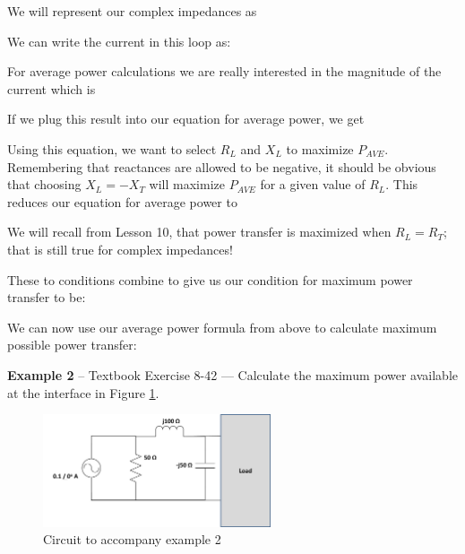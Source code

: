 \documentclass{handout}
\begin{document}
We will represent our complex impedances as
\soln{1in}{
\[
\mathbf{Z_T}=R_T+jX_T
\]
\[
\mathbf{Z_L}=R_L+jX_L
\]
}

We can write the current in this loop as:
\soln{2in}{
\[
\mathbf{I}=\frac{\mathbf{V_T}}{R_T+jX_T+R_L+jX_L}
\]
\[
\mathbf{I}=\frac{\mathbf{V_T}}{(R_T+R_L)+j(X_T+X_L)}
\]
}

For average power calculations we are really interested in the magnitude of the current which is
\soln{1in}{
\[
|\mathbf{I}| =\frac{|\mathbf{V_T}|}{\sqrt{(R_T+R_L)^2+(X_T+X_L)^2}}
\]
}

If we plug this result into our equation for average power, we get
\soln{2in}{
\[
P_{AVE} = \frac{R_L}{2}\frac{|\mathbf{V_T}|^2}{(R_T+R_L)^2+(X_T+X_L)^2}
\]
}

Using this equation, we want to select $R_L$ and $X_L$ to maximize $P_{AVE}$.  Remembering that reactances  are allowed to be negative, it should be obvious that choosing $X_L=-X_T$ will maximize $P_{AVE}$ for a given value of $R_L$.  This reduces our equation for average power to
\soln{2in}{
\[
P_{AVE} = \frac{R_L}{2}\frac{|\mathbf{V_T}|^2}{(R_T+R_L)^2}
\]
}

We will recall from Lesson 10, that power transfer is maximized when $R_L=R_T$; that is still true for complex impedances!

These to conditions combine to give us our condition for maximum power transfer to be:

We can now use our average power formula from above to calculate maximum possible power transfer:
\soln{2in}{
\[
P_{AVE} = \frac{R_L}{2}\frac{|\mathbf{V_T}|^2}{(R_T+R_T)^2+(X_T-X_T)^2} = \frac{|\mathbf{V_T}|^2}{8R_T}
\]
}

\textbf{Example 2} -- Textbook Exercise 8-42 --- Calculate the maximum power available at the interface in Figure \ref{fig: Example2}.
\begin{figure} [h!]
\centering
\includegraphics[width=0.6\textwidth]{Example2.jpg}
\caption{Circuit to accompany example 2}
\label{fig: Example2}
\end{figure}
\end{document}
